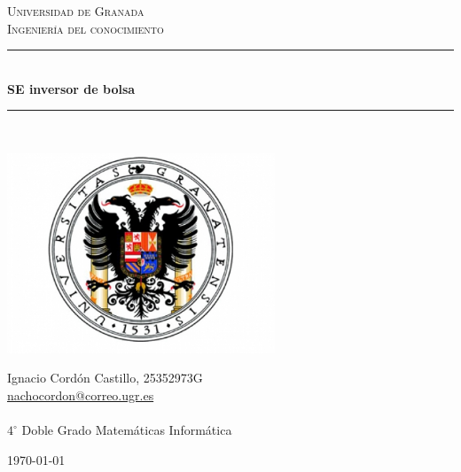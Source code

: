 \documentclass[a4paper,11pt]{article}
\begin{document}
\begin{titlepage}

\newcommand{\HRule}{\rule{\linewidth}{0.5mm}} %

\center %

\textsc{\LARGE Universidad de Granada}\\[1.5cm]
\textsc{\Large Ingeniería del conocimiento}\\[0.5cm]

\bigskip
\HRule \\[0.4cm]
{ \huge \bfseries SE inversor de bolsa}\\[0.4cm] %
\HRule \\[1.5cm]


\begin{center}
\includegraphics[width=8cm]{./data/ugr.jpg}
\end{center}

\begin{minipage}{\textwidth}
\begin{center} \large
Ignacio Cordón Castillo, 25352973G\\
\url{nachocordon@correo.ugr.es}\\
\ \\
$4^{\circ}$ Doble Grado Matemáticas Informática\\
\end{center}
\end{minipage}


\vspace{\fill}%
\large\today
\end{titlepage}
\end{document}
